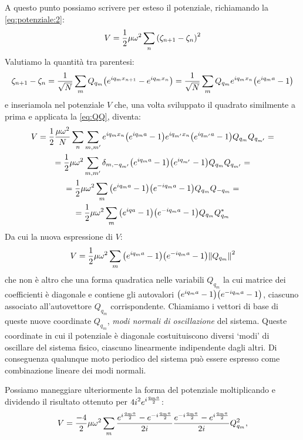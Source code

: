             \par A questo punto possiamo scrivere per esteso il potenziale, richiamando la \eqref{eq:potenziale:2}:
                $$V=\frac{1}{2}\mu\omega^2\sum_n\qty(\zeta_{n+1}-\zeta_n)^2$$
            Valutiamo la quantit\`a tra parentesi:
                $$\zeta_{n+1}-\zeta_n=\frac{1}{\sqrt{N}}\sum_mQ_{q_m}\qty(e^{iq_mx_{n+1}}-e^{iq_mx_n})=\frac{1}{\sqrt{N}}\sum_mQ_{q_m}e^{iq_mx_n}\qty(e^{iq_ma}-1)$$
            e inseriamola nel potenziale $V$ che, una volta sviluppato il quadrato similmente a prima e applicata la \eqref{eq:QQ}, diventa:
            \begin{multline*}
                V=\frac{1}{2}\frac{\mu\omega^2}{N}\sum_n\sum_{m,m'}e^{iq_mx_n}\qty(e^{iq_ma}-1)e^{iq_{m'}x_n}\bigl(e^{iq_{m'}a}-1\bigr)Q_{q_m}Q_{q_{m'}}=\\=\frac{1}{2}\mu\omega^2\sum_{m,m'}\delta_{m,-q_{m'}}\qty(e^{iq_ma}-1)\bigl(e^{iq_{m'}}-1\bigr)Q_{q_m}Q_{q_{m'}}=\\=\frac{1}{2}\mu\omega^2\sum_m\qty(e^{iq_ma}-1)\qty(e^{-iq_ma}-1)Q_{q_m}Q_{-q_m}=\\=\frac{1}{2}\mu\omega^2\sum_m\qty(e^{iqa}-1)\qty(e^{-iq_ma}-1)Q_{q_m}Q_{q_m}^*
            \end{multline*}
            Da cui la nuova espressione di $V$:
            \begin{equation}
                V=\frac{1}{2}\mu\omega^2\sum_m\qty(e^{iq_ma}-1)\qty(e^{-iq_ma}-1)\norm{Q_{q_m}}^2
            \end{equation}
            che non \`e altro che una forma quadratica nelle variabili $Q_{q_m}$ la cui matrice dei coefficienti \`e diagonale e contiene gli autovalori $\qty(e^{iq_ma}-1)\qty(e^{-iq_ma}-1)$, ciascuno associato all'autovettore $Q_{q_m}$ corrispondente. Chiamiamo i vettori di base di queste nuove coordinate $Q_{q_m}$, \emph{modi normali di oscillazione} del sistema. Queste coordinate in cui il potenziale \`e diagonale costuituiscono diversi `modi' di oscillare del sistema fisico, ciascuno linearmente indipendente dagli altri. Di conseguenza qualunque moto periodico del sistema pu\`o essere espresso come combinazione lineare dei modi normali.
            \par Possiamo maneggiare ulteriormente la forma del potenziale moltiplicando e dividendo il risultato ottenuto per $\displaystyle 4i^2e^{i\frac{q_ma}{2}}$:
                $$V=\frac{-4}{2}\mu\omega^2\sum_m\frac{e^{i\frac{q_ma}{2}}-e^{-i\frac{q_ma}{2}}}{2i}\frac{e^{-i\frac{q_ma}{2}}-e^{i\frac{q_ma}{2}}}{2i}Q_{q_m}^2,$$
